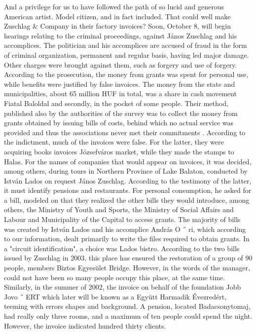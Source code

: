 And a privilege for us to have followed the path of so lucid and generous American artist.
Model citizen, and in fact included.
That could well make Zuschlag & Company in their factory invoices?
Soon, October 8, will begin hearings relating to the criminal proceedings, against János Zuschlag and his accomplices.
The politician and his accomplices are accused of fraud in the form of criminal organization, permanent and regular basis, having led major damage. Other charges were brought against them, such as forgery and use of forgery.
According to the prosecution, the money from grants was spent for personal use, while benefits were justified by false invoices.
The money from the state and municipalities, about 65 million HUF in total, was a share in cash movement Fiatal Baloldal and secondly, in the pocket of some people.
Their method, published also by the authorities of the survey was to collect the money from grants obtained by issuing bills of costs, behind which no actual service was provided and thus the associations never met their commitments .
According to the indictment, much of the invoices were false.
For the latter, they were acquiring books invoices Józsefváros market, while they made the stamps to Halas.
For the names of companies that would appear on invoices, it was decided, among others, during tours in Northern Province of Lake Balaton, conducted by István Lados on request János Zuschlag.
According to the testimony of the latter, it must identify pensions and restaurants.
For personal consumption, he asked for a bill, modeled on that they realized the other bills they would introduce, among others, the Ministry of Youth and Sports, the Ministry of Social Affairs and Labour and Municipality of the Capital to access grants.
The majority of bills was created by István Lados and his accomplice András O ˝ ri, which according to our information, dealt primarily to write the files required to obtain grants.
In a "circuit identification", a choice was Lados bistro.
According to the two bills issued by Zuschlag in 2003, this place has ensured the restoration of a group of 90 people, members Biztos Egyesület Bridge.
However, in the words of the manager, could not have been so many people occupy this place, at the same time.
Similarly, in the summer of 2002, the invoice on behalf of the foundation Jobb Jovo ˝ ERT which later will be known as a Együtt Harmadik Évezredért, teeming with errors shapes and background.
A pension, located Badacsonytomaj, had really only three rooms, and a maximum of ten people could spend the night. However, the invoice indicated hundred thirty clients.
